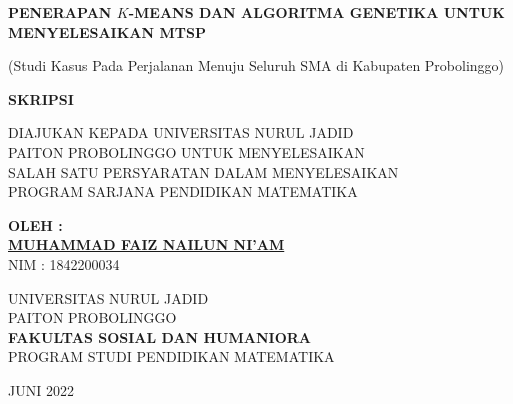    
\begin{center}

\textbf{PENERAPAN $K$-MEANS DAN ALGORITMA GENETIKA UNTUK MENYELESAIKAN MTSP}
       
       (Studi Kasus Pada Perjalanan Menuju Seluruh SMA di Kabupaten Probolinggo) 
       
       \vfill
       \textbf{SKRIPSI}
       \vfill
       
       DIAJUKAN KEPADA UNIVERSITAS NURUL JADID \\
       PAITON PROBOLINGGO UNTUK MENYELESAIKAN \\ SALAH SATU PERSYARATAN DALAM MENYELESAIKAN \\ PROGRAM SARJANA PENDIDIKAN MATEMATIKA
       
       \vfill       
       
       \textbf{OLEH :}\\
       \textbf{\underline{MUHAMMAD FAIZ NAILUN NI'AM}}\\
       NIM : 1842200034

       \vfill
       
       UNIVERSITAS NURUL JADID\\
       PAITON PROBOLINGGO\\
     \textbf{FAKULTAS SOSIAL DAN HUMANIORA}\\       
       PROGRAM STUDI PENDIDIKAN MATEMATIKA\\
       
       \vfill       
       
       JUNI 2022
       
   \end{center}